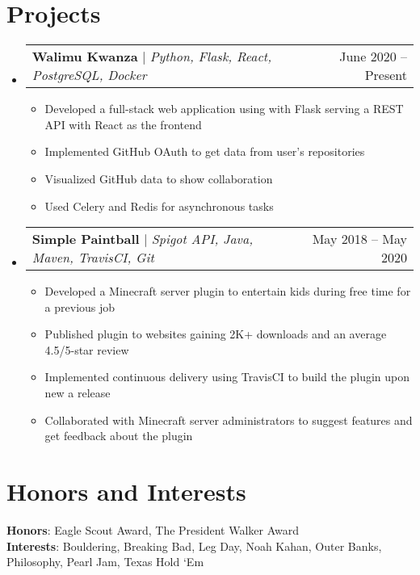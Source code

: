 \documentclass[letterpaper,11pt]{article}
\makeatletter
\newcommand{\resumeItem}[1]{
  \item\small{
    {#1 \vspace{-2pt}}
  }
}
\newcommand{\resumeProjectHeading}[2]{
    \item
    \begin{tabular*}{0.97\textwidth}{l@{\extracolsep{\fill}}r}
      \small#1 & #2 \\
    \end{tabular*}\vspace{-7pt}
}
\newcommand{\resumeSubHeadingListStart}{\begin{itemize}[leftmargin=0.0in, label={}]}
\newcommand{\resumeSubHeadingListEnd}{\end{itemize}}
\newcommand{\resumeItemListStart}{\begin{itemize}}
\newcommand{\resumeItemListEnd}{\end{itemize}\vspace{-5pt}}
\makeatother
\begin{document}
\section{Projects}
    \resumeSubHeadingListStart
      \resumeProjectHeading
          {\textbf{Walimu Kwanza} $|$ \emph{Python, Flask, React, PostgreSQL, Docker}}{June 2020 -- Present}
          \resumeItemListStart
            \resumeItem{Developed a full-stack web application using with Flask serving a REST API with React as the frontend}
            \resumeItem{Implemented GitHub OAuth to get data from user’s repositories}
            \resumeItem{Visualized GitHub data to show collaboration}
            \resumeItem{Used Celery and Redis for asynchronous tasks}
          \resumeItemListEnd
      \resumeProjectHeading
          {\textbf{Simple Paintball} $|$ \emph{Spigot API, Java, Maven, TravisCI, Git}}{May 2018 -- May 2020}
          \resumeItemListStart
            \resumeItem{Developed a Minecraft server plugin to entertain kids during free time for a previous job}
            \resumeItem{Published plugin to websites gaining 2K+ downloads and an average 4.5/5-star review}
            \resumeItem{Implemented continuous delivery using TravisCI to build the plugin upon new a release}
            \resumeItem{Collaborated with Minecraft server administrators to suggest features and get feedback about the plugin}
          \resumeItemListEnd
    \resumeSubHeadingListEnd



%
\section{Honors and Interests}
 \begin{itemize}[leftmargin=0.0in, label={}]
    \small{\item{
     \textbf{Honors}{: Eagle Scout Award, The President Walker Award} \\
     \textbf{Interests}{: Bouldering, Breaking Bad, Leg Day, Noah Kahan, Outer Banks, Philosophy, Pearl Jam, Texas Hold ‘Em} \\
    }}
 \end{itemize}


\end{document}
